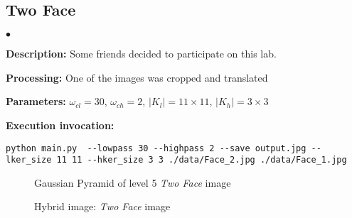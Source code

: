 \documentclass{article}
\newcommand{\squishlist}{
 \begin{list}{$\bullet$}
  { \setlength{\itemsep}{0pt}
     \setlength{\parsep}{3pt}
     \setlength{\topsep}{3pt}
     \setlength{\partopsep}{0pt}
     \setlength{\leftmargin}{1.5em}
     \setlength{\labelwidth}{1em}
     \setlength{\labelsep}{0.5em} } }
\newcommand{\squishend}{
  \end{list}  }
\newcounter{proofc}
\renewcommand\theproofc{(\arabic{proofc})}
\DeclareRobustCommand\stepproofc{\refstepcounter{proofc}\theproofc}
\begin{document}
\subsection*{Two Face}
\squishlist
\item \textbf{Description:} Some friends decided to participate on this lab.
\item \textbf{Processing:} One of the images was cropped and translated
\item \textbf{Parameters:} $\omega_{cl} = 30$, $\omega_{ch} = 2$, $|K_{l}| = 11 \times 11$, $|K_{h}| = 3 \times 3$
\item \textbf{Execution invocation:}
\squishend

\begin{verbatim}
python main.py  --lowpass 30 --highpass 2 --save output.jpg --lker_size 11 11 --hker_size 3 3 ./data/Face_2.jpg ./data/Face_1.jpg 
\end{verbatim}

\begin{figure*}[!htbp]
	\centering
	\caption{Gaussian Pyramid of level 5 \textit{Two Face} image}
\end{figure*}


\begin{figure*}[!htbp]
	\centering
	\caption{Hybrid image: \textit{Two Face} image}
\end{figure*}


\end{document}
